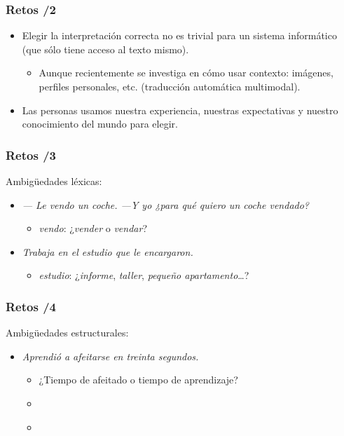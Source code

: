 \documentclass{beamer}
\begin{document}
\begin{frame}
\frametitle{Retos /2}
\begin{itemize}
\item Elegir la interpretación correcta no es trivial para un sistema
informático (que sólo tiene acceso al texto mismo).\pause
\begin{itemize}
\item Aunque recientemente se investiga en cómo usar  contexto: imágenes, perfiles personales, etc. (traducción automática multimodal).\pause
\end{itemize}

\item Las personas usamos nuestra experiencia, nuestras expectativas y nuestro conocimiento del mundo para elegir.

\end{itemize}



\end{frame} 

\begin{frame}
  \frametitle{Retos /3}
  Ambigüedades léxicas:
  \begin{itemize}
  \item \emph{--- Le vendo un coche. ---Y yo ¿para qué quiero un coche vendado?}\pause
    \begin{itemize}
    \item \emph{vendo}: ¿\emph{vender} o \emph{vendar}?
    \end{itemize}\pause
  \item \emph{Trabaja en el estudio que le encargaron.}\pause
    \begin{itemize}
    \item \emph{estudio}: ¿\emph{informe}, \emph{taller}, \emph{pequeño apartamento}\ldots?
    \end{itemize}\pause
  \end{itemize}
\end{frame}


\begin{frame}
  \frametitle{Retos /4}
  Ambigüedades estructurales:
  \begin{itemize}
  \item \emph{Aprendió a afeitarse en treinta segundos.}\pause
    \begin{itemize}
    \item ¿Tiempo de afeitado o tiempo de aprendizaje?\pause
    \item \emph{ } \pause
    \item \emph{ } 
    \end{itemize}
  \end{itemize}
\end{frame}
\end{document}
